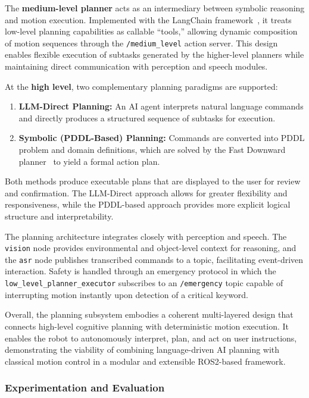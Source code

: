 \documentclass[12pt]{extarticle}
\begin{document}
The \textbf{medium-level planner} acts as an intermediary between symbolic reasoning and motion execution. Implemented with the LangChain framework~\cite{langchain-docs}, it treats low-level planning capabilities as callable “tools,” allowing dynamic composition of motion sequences through the \texttt{/medium\_level} action server. This design enables flexible execution of subtasks generated by the higher-level planners while maintaining direct communication with perception and speech modules.

At the \textbf{high level}, two complementary planning paradigms are supported:
\begin{enumerate}
\item \textbf{LLM-Direct Planning:} An AI agent interprets natural language commands and directly produces a structured sequence of subtasks for execution.
\item \textbf{Symbolic (PDDL-Based) Planning:} Commands are converted into PDDL problem and domain definitions, which are solved by the Fast Downward planner~\cite{the-fast-downward-planning-system} to yield a formal action plan.
\end{enumerate}
Both methods produce executable plans that are displayed to the user for review and confirmation. The LLM-Direct approach allows for greater flexibility and responsiveness, while the PDDL-based approach provides more explicit logical structure and interpretability.

The planning architecture integrates closely with perception and speech. The \texttt{vision} node provides environmental and object-level context for reasoning, and the \texttt{asr} node publishes transcribed commands to a topic, facilitating event-driven interaction. Safety is handled through an emergency protocol in which the \texttt{low\_level\_planner\_executor} subscribes to an \texttt{/emergency} topic capable of interrupting motion instantly upon detection of a critical keyword.

Overall, the planning subsystem embodies a coherent multi-layered design that connects high-level cognitive planning with deterministic motion execution. It enables the robot to autonomously interpret, plan, and act on user instructions, demonstrating the viability of combining language-driven AI planning with classical motion control in a modular and extensible ROS2-based framework.

\subsubsection{Experimentation and Evaluation}
\end{document}
